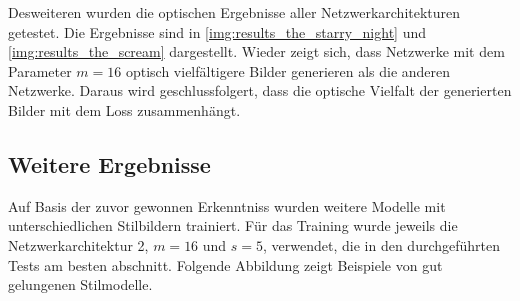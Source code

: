 Desweiteren wurden die optischen Ergebnisse aller Netzwerkarchitekturen getestet. Die Ergebnisse sind in \ref{img:results_the_starry_night} und \ref{img:results_the_scream} dargestellt. Wieder zeigt sich, dass Netzwerke mit dem Parameter $ m = 16 $ optisch vielfältigere Bilder generieren als die anderen Netzwerke. Daraus wird geschlussfolgert, dass die optische Vielfalt der generierten Bilder mit dem Loss zusammenhängt.



\subsection{Weitere Ergebnisse}

Auf Basis der zuvor gewonnen Erkenntniss wurden weitere Modelle mit unterschiedlichen Stilbildern trainiert. Für das Training wurde jeweils die Netzwerkarchitektur 2, $ m = 16 $ und $ s = 5 $, verwendet, die in den durchgeführten Tests am besten abschnitt. Folgende Abbildung zeigt Beispiele von gut gelungenen Stilmodelle.

\pagebreak

